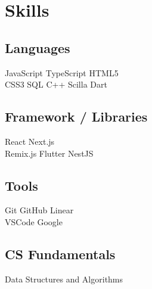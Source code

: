 \documentclass[]{deedy-resume-openfont}
\begin{document}
%
%
\lastupdated

%
%

%
%

\begin{minipage}[t]{0.28\textwidth} 



\section{Skills}
\subsection{Languages}

\textbullet JavaScript \textbullet TypeScript  \textbullet{} HTML5 \\ \textbullet CSS3  \textbullet SQL \textbullet{} C++ \textbullet Scilla \textbullet Dart
\sectionsep

\subsection{Framework / Libraries}
 \textbullet React \textbullet{}   Next.js \\ \textbullet{} Remix.js 
  \textbullet{} Flutter \textbullet{} NestJS
\sectionsep
\subsection{Tools}
 \textbullet Git \textbullet{}   GitHub \textbullet{} Linear\\ \textbullet{} VSCode  \textbullet{} Google 
\sectionsep
 \subsection{CS Fundamentals}
 \textbullet{}   Data Structures and Algorithms \\   \\ 
\sectionsep


\end{minipage}
\end{document}
